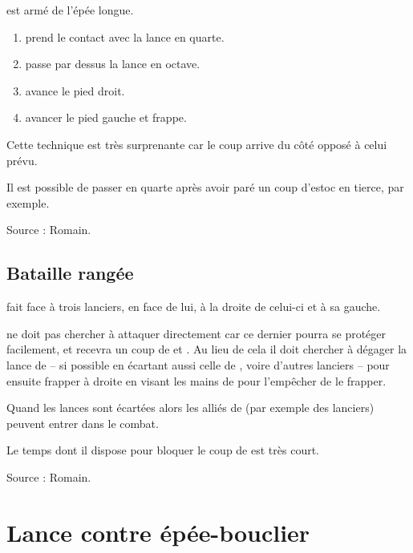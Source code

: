 \begin{technique}

\A est armé de l'épée longue.

\begin{enumerate}
	\item \A prend le contact avec la lance en quarte.
	
	\item \A passe par dessus la lance en octave.
	
	\item \A avance le pied droit.
	
	\item \A avancer le pied gauche et frappe.
\end{enumerate}

Cette technique est très surprenante car le coup arrive du côté opposé à celui prévu.

Il est possible de passer en quarte après avoir paré un coup d'estoc en tierce, par exemple.

Source : Romain.
\end{technique}


\subsection{Bataille rangée}


\begin{technique}

\A fait face à trois lanciers,  en face de lui,  à la droite de celui-ci et  à sa gauche.

\A ne doit pas chercher à attaquer directement  car ce dernier pourra se protéger facilement, et \A recevra un coup de  et .
Au lieu de cela il doit chercher à dégager la lance de  – si possible en écartant aussi celle de , voire d'autres lanciers – pour ensuite frapper à droite en visant les mains de  pour l'empêcher de le frapper.

Quand les lances sont écartées alors les alliés de \A (par exemple des lanciers) peuvent entrer dans le combat.

Le temps dont il dispose pour bloquer le coup de  est très court.

Source : Romain.
\end{technique}



\section{Lance contre épée-bouclier}


